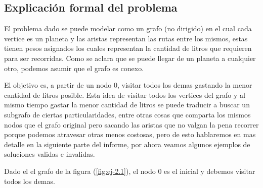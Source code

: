 \subsection{Explicación formal del problema}

El problema dado se puede modelar como un grafo (no dirigido) en el cual cada vertice es un planeta y las aristas representan las rutas entre los mismos, estas tienen pesos asignados los cuales representan la cantidad de litros que requieren para ser recorridas. Como se aclara que se puede llegar de un planeta a cualquier otro, podemos asumir que el grafo es conexo.

El objetivo es, a partir de un nodo 0, visitar todos los demas gastando la menor cantidad de litros posible. Esta idea de visitar todos los vertices del grafo y al mismo tiempo gastar la menor cantidad de litros se puede traducir a buscar un subgrafo de ciertas particularidades, entre otras cosas que comparta los mismos nodos que el grafo original pero sacando las aristas que no valgan la pena recorrer porque podemos atravesar otras menos costosas, pero de esto hablaremos en mas detalle en la siguiente parte del informe, por ahora veamos algunos ejemplos de soluciones validas e invalidas.

Dado el el grafo de la figura (\ref{fig:ej-2.1}), el nodo 0 es el inicial y debemos visitar todos los demas.

